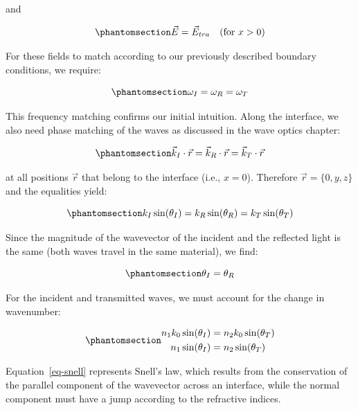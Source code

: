 \documentclass[
  a4paper,
]{book}
\begin{document}
and

\begin{equation}\phantomsection\label{eq-total-field-right}{
\vec{E}=\vec{E}_{tra}
\quad \text{(for } x>0 \text{)}
}\end{equation}

For these fields to match according to our previously described boundary
conditions, we require:

\begin{equation}\phantomsection\label{eq-frequency-matching}{
\omega_I=\omega_R=\omega_T
}\end{equation}

This frequency matching confirms our initial intuition. Along the
interface, we also need phase matching of the waves as discussed in the
wave optics chapter:

\begin{equation}\phantomsection\label{eq-phase-matching}{
\vec{k}_I\cdot \vec{r}=\vec{k}_R\cdot \vec{r}=\vec{k}_T\cdot \vec{r}
}\end{equation}

at all positions \(\vec{r}\) that belong to the interface (i.e.,
\(x=0\)). Therefore \(\vec{r}=\lbrace 0,y,z \rbrace\) and the equalities
yield:

\begin{equation}\phantomsection\label{eq-snell-prelim}{
k_I\sin(\theta_I)=k_R\sin(\theta_R)=k_T\sin(\theta_T)
}\end{equation}

Since the magnitude of the wavevector of the incident and the reflected
light is the same (both waves travel in the same material), we find:

\begin{equation}\phantomsection\label{eq-reflection-angle}{
\theta_I=\theta_R
}\end{equation}

For the incident and transmitted waves, we must account for the change
in wavenumber:

\begin{equation}\phantomsection\label{eq-snell}{
\begin{aligned}
n_1 k_0\sin(\theta_I) &= n_2 k_0\sin(\theta_T) \\
n_1 \sin(\theta_I) &= n_2 \sin(\theta_T)
\end{aligned}
}\end{equation}

Equation~\ref{eq-snell} represents Snell's law, which results from the
conservation of the parallel component of the wavevector across an
interface, while the normal component must have a jump according to the
refractive indices.
\end{document}
